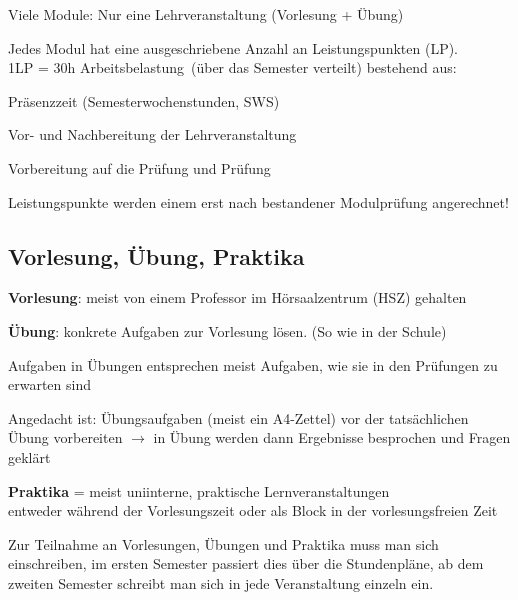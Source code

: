 \documentclass[a4paper,12pt]{report}
\begin{document}
\begin{itemize*}
	\item Viele Module: Nur eine Lehrveranstaltung (Vorlesung + Übung)
	\item Jedes Modul hat eine ausgeschriebene Anzahl an Leistungspunkten (LP).\\
	1LP = 30h \glqq Arbeitsbelastung\grqq\ (über das Semester verteilt) bestehend aus:
	\begin{itemize*}
		\item Präsenzzeit (Semesterwochenstunden, SWS)
		\item Vor- und Nachbereitung der Lehrveranstaltung
		\item Vorbereitung auf die Prüfung und Prüfung
	\end{itemize*}
	Leistungspunkte werden einem erst nach bestandener Modulprüfung angerechnet!
\end{itemize*}

\subsection{Vorlesung, Übung, Praktika}
\begin{itemize*}
	\item \textbf{Vorlesung}: meist von einem Professor im Hörsaalzentrum (HSZ) gehalten
	\item \textbf{Übung}: konkrete Aufgaben zur Vorlesung lösen. (So wie in der Schule)
	\item Aufgaben in Übungen entsprechen meist Aufgaben, wie sie in den Prüfungen zu erwarten sind
	\item Angedacht ist: Übungsaufgaben (meist ein A4-Zettel) vor der tatsächlichen Übung vorbereiten $\rightarrow$ in Übung werden dann Ergebnisse besprochen und Fragen geklärt
	\item \textbf{Praktika} = meist uniinterne, praktische Lernveranstaltungen\\
		entweder während der Vorlesungszeit oder als Block in der vorlesungsfreien Zeit
	\item Zur Teilnahme an Vorlesungen, Übungen und Praktika muss man sich einschreiben, im ersten Semester passiert dies über die Stundenpläne, ab dem zweiten Semester schreibt man sich in jede Veranstaltung einzeln ein.
\end{itemize*}
		
\end{document}
